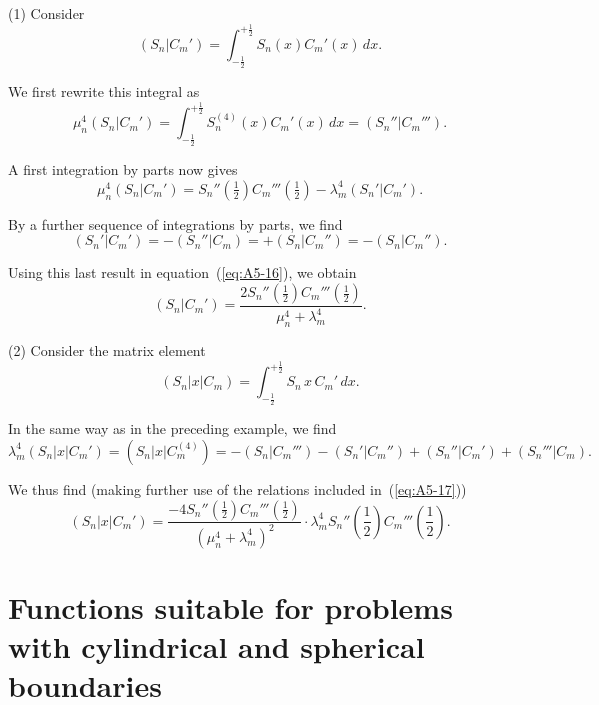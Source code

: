 (1) Consider
\begin{equation}
\label{eq:A5-14}
(S_n|C_m') = \int_{-\frac{1}{2}}^{+\frac{1}{2}} S_n(x) C_m'(x) \, dx.
\end{equation}

We first rewrite this integral as
\begin{equation}
\label{eq:A5-15}
\mu_n^4 (S_n|C_m') = \int_{-\frac{1}{2}}^{+\frac{1}{2}} S_n^{(4)}(x) C_m'(x) \, dx = (S_n''|C_m''').
\end{equation}

A first integration by parts now gives
\begin{equation}
\label{eq:A5-16}
\mu_n^4 (S_n|C_m') = S_n''({\tfrac{1}{2}}) C_m'''({\tfrac{1}{2}}) - \lambda_m^4 (S_n'|C_m').
\end{equation}

By a further sequence of integrations by parts, we find
\begin{equation}
\label{eq:A5-17}
(S_n'|C_m') = -(S_n''|C_m) = +(S_n|C_m'') = -(S_n|C_m'').
\end{equation}

Using this last result in equation~(\ref{eq:A5-16}), we obtain
\begin{equation}
\label{eq:A5-18}
(S_n|C_m') = \frac{2 S_n''(\frac{1}{2}) C_m'''(\frac{1}{2})}{\mu_n^4 + \lambda_m^4}.
\end{equation}

(2) Consider the matrix element
\begin{equation}
\label{eq:A5-19}
(S_n|x|C_m) = \int_{-\frac{1}{2}}^{+\frac{1}{2}} S_n \, x \, C_m' \, dx.
\end{equation}

In the same way as in the preceding example, we find
\begin{equation}
\label{eq:A5-20}
\lambda_m^4 (S_n|x|C_m') = (S_n|x|C_m^{(4)}) = -(S_n|C_m''') -(S_n'|C_m'') + (S_n''|C_m') + (S_n'''|C_m).
\end{equation}

We thus find (making further use of the relations included in~(\ref{eq:A5-17}))
\begin{equation}
\label{eq:A5-21}
(S_n|x|C_m') = \frac{-4 S_n''(\frac{1}{2}) C_m'''(\frac{1}{2})}{\left(\mu_n^4 + \lambda_m^4\right)^2} \cdot \lambda_m^4 S_n''(\frac{1}{2}) C_m'''(\frac{1}{2}).
\end{equation}

\section{Functions suitable for problems with cylindrical and spherical boundaries}
\label{sec:134}


